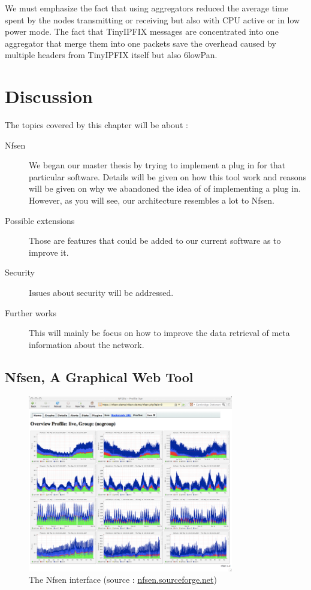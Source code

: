 We must emphasize the fact that using aggregators reduced the average time spent by the nodes transmitting or receiving but also with CPU active or in low power mode. The fact that TinyIPFIX messages are concentrated into one aggregator that merge them into one packets save the overhead caused by multiple headers from TinyIPFIX itself but also 6lowPan.


\chapter{Discussion}

The topics covered by this chapter will be about :

\begin{description}
	\item[Nfsen] We began our master thesis by trying to implement a plug in for that particular software. Details will be given on how this tool work and reasons will be given on why we abandoned the idea of of implementing a plug in. However, as you will see, our architecture resembles a lot to Nfsen.
	\item[Possible extensions] Those are features that could be added to our current software as to improve it.
	\item[Security] Issues about security will be addressed.
  \item[Further works] This will mainly be focus on how to improve the data retrieval of meta information about the network.
\end{description}

\section{Nfsen, A Graphical Web Tool}

\begin{figure}[!h]
	\centering
	\includegraphics[width=0.8\textwidth]{res/nfsen.png}
	\caption{The Nfsen interface (source : \url{nfsen.sourceforge.net})}
	\label{fig:nfsen}
\end{figure}

